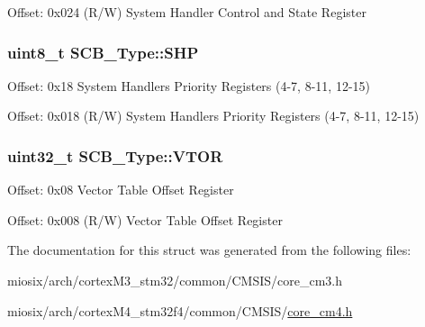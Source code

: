 Offset\-: 0x024 (R/\-W) System Handler Control and State Register \hypertarget{struct_s_c_b___type_a543537c7b61874db058cc8e91a7aff0e}{
\subsubsection[{S\-H\-P}]{ uint8\-\_\-t S\-C\-B\-\_\-\-Type\-::\-S\-H\-P}}\label{struct_s_c_b___type_a543537c7b61874db058cc8e91a7aff0e}
Offset\-: 0x18 System Handlers Priority Registers (4-\/7, 8-\/11, 12-\/15)

Offset\-: 0x018 (R/\-W) System Handlers Priority Registers (4-\/7, 8-\/11, 12-\/15) \hypertarget{struct_s_c_b___type_a0faf96f964931cadfb71cfa54e051f6f}{
\subsubsection[{V\-T\-O\-R}]{ uint32\-\_\-t S\-C\-B\-\_\-\-Type\-::\-V\-T\-O\-R}}\label{struct_s_c_b___type_a0faf96f964931cadfb71cfa54e051f6f}
Offset\-: 0x08 Vector Table Offset Register

Offset\-: 0x008 (R/\-W) Vector Table Offset Register 

The documentation for this struct was generated from the following files\-:\begin{DoxyCompactItemize}
\item 
miosix/arch/cortex\-M3\-\_\-stm32/common/\-C\-M\-S\-I\-S/core\-\_\-cm3.\-h\item 
miosix/arch/cortex\-M4\-\_\-stm32f4/common/\-C\-M\-S\-I\-S/\hyperlink{core__cm4_8h}{core\-\_\-cm4.\-h}\end{DoxyCompactItemize}
